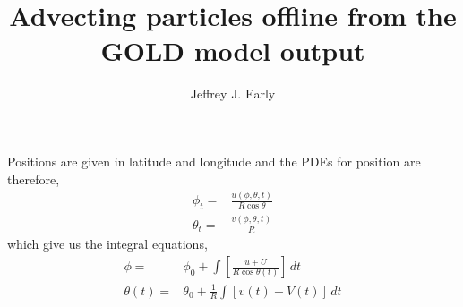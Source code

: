 \documentclass[11pt, oneside]{article}   	%
\title{Advecting particles offline from the GOLD model output}
\author{Jeffrey J. Early}
\begin{document}
\maketitle

Positions are given in latitude and longitude and the PDEs for position are therefore,
\begin{align}
\phi_t =& \frac{u(\phi,\theta,t)}{R \cos \theta} \\
\theta_t =& \frac{v(\phi,\theta,t)}{R}
\end{align}
which give us the integral equations,
\begin{align}
\phi =& \phi_0 + \int \left[ \frac{u+U}{R \cos \theta(t)} \right] \, dt \\
\theta(t) =& \theta_0 + \frac{1}{R} \int \left[ v(t) + V(t) \right] \, dt \\
\end{align}
\end{document}
